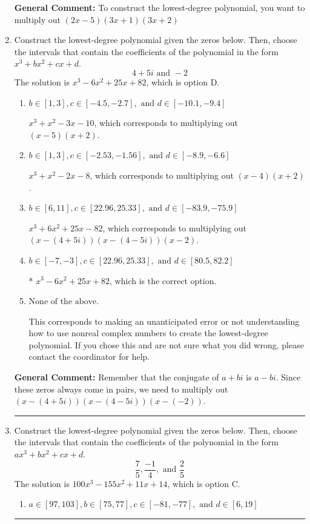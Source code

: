 \documentclass{extbook}[14pt]
\newcommand{\litem}[1]{\item #1

\rule{\textwidth}{0.4pt}}
\begin{document}
\begin{enumerate}
{\textbf{General Comment:} To construct the lowest-degree polynomial, you want to multiply out $(2x -5)(3x + 1)(3x + 2)$
}
\litem{
Construct the lowest-degree polynomial given the zeros below. Then, choose the intervals that contain the coefficients of the polynomial in the form $x^3+bx^2+cx+d$.
\[ 4 + 5 i \text{ and } -2 \]The solution is \( x^{3} -6 x^{2} +25 x + 82 \), which is option D.\begin{enumerate}[label=\Alph*.]
\item \( b \in [1, 3], c \in [-4.5, -2.7], \text{ and } d \in [-10.1, -9.4] \)

$x^{3} + x^{2} -3 x -10$, which corresponds to multiplying out $(x -5)(x + 2)$.
\item \( b \in [1, 3], c \in [-2.53, -1.56], \text{ and } d \in [-8.9, -6.6] \)

$x^{3} + x^{2} -2 x -8$, which corresponds to multiplying out $(x -4)(x + 2)$.
\item \( b \in [6, 11], c \in [22.96, 25.33], \text{ and } d \in [-83.9, -75.9] \)

$x^{3} +6 x^{2} +25 x -82$, which corresponds to multiplying out $(x-(4 + 5 i))(x-(4 - 5 i))(x -2)$.
\item \( b \in [-7, -3], c \in [22.96, 25.33], \text{ and } d \in [80.5, 82.2] \)

* $x^{3} -6 x^{2} +25 x + 82$, which is the correct option.
\item \( \text{None of the above.} \)

This corresponds to making an unanticipated error or not understanding how to use nonreal complex numbers to create the lowest-degree polynomial. If you chose this and are not sure what you did wrong, please contact the coordinator for help.
\end{enumerate}

\textbf{General Comment:} Remember that the conjugate of $a+bi$ is $a-bi$. Since these zeros always come in pairs, we need to multiply out $(x-(4 + 5 i))(x-(4 - 5 i))(x-(-2))$.
}
\litem{
Construct the lowest-degree polynomial given the zeros below. Then, choose the intervals that contain the coefficients of the polynomial in the form $ax^3+bx^2+cx+d$.
\[ \frac{7}{5}, \frac{-1}{4}, \text{ and } \frac{2}{5} \]The solution is \( 100x^{3} -155 x^{2} +11 x + 14 \), which is option C.\begin{enumerate}[label=\Alph*.]
\item \( a \in [97, 103], b \in [75, 77], c \in [-81, -77], \text{ and } d \in [6, 19] \)


\end{enumerate}}
\end{enumerate}
\end{document}
